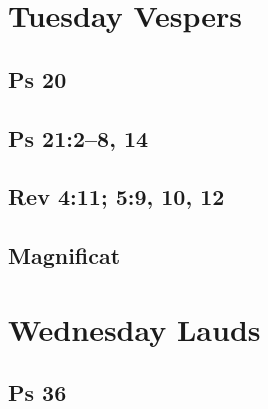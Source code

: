 \section{Tuesday Vespers}

\subsection{Ps 20}

{%
\parindent 0pt
\noindent
\ifx\preLilyPondExample \undefined
\else
  \expandafter\preLilyPondExample
\fi
\def\lilypondbook{}%

\ifx\postLilyPondExample \undefined
\else
  \expandafter\postLilyPondExample
\fi
}

\subsection{Ps 21:2--8, 14}

{%
\parindent 0pt
\noindent
\ifx\preLilyPondExample \undefined
\else
  \expandafter\preLilyPondExample
\fi
\def\lilypondbook{}%

\ifx\postLilyPondExample \undefined
\else
  \expandafter\postLilyPondExample
\fi
}

\subsection{Rev 4:11; 5:9, 10, 12}

{%
\parindent 0pt
\noindent
\ifx\preLilyPondExample \undefined
\else
  \expandafter\preLilyPondExample
\fi
\def\lilypondbook{}%

\ifx\postLilyPondExample \undefined
\else
  \expandafter\postLilyPondExample
\fi
}

\subsection{Magnificat}

{%
\parindent 0pt
\noindent
\ifx\preLilyPondExample \undefined
\else
  \expandafter\preLilyPondExample
\fi
\def\lilypondbook{}%

\ifx\postLilyPondExample \undefined
\else
  \expandafter\postLilyPondExample
\fi
}


\section{Wednesday Lauds}

\subsection{Ps 36}

